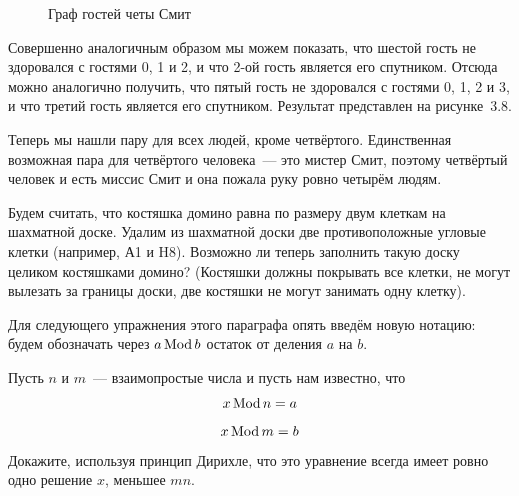 \begin{example}
\begin{figure}[h]
\caption{Граф гостей четы Смит}
\end{figure}

Совершенно аналогичным образом мы можем показать, что шестой гость не здоровался с гостями 0, 1 и 2, и что 2-ой гость является его спутником. Отсюда можно аналогично получить, что пятый гость не здоровался с гостями 0, 1, 2 и 3, и что третий гость является его спутником. Результат представлен на рисунке~3.8.

Теперь мы нашли пару для всех людей, кроме четвёртого. Единственная возможная пара для четвёртого человека~— это мистер Смит, поэтому четвёртый человек и есть миссис Смит и она пожала руку ровно четырём людям.
\end{example}

\begin{exercise}
Будем считать, что костяшка домино равна по размеру двум клеткам на шахматной доске. Удалим из шахматной доски две противоположные угловые клетки (например, А1 и H8). Возможно ли теперь заполнить такую доску целиком костяшками домино? (Костяшки должны покрывать все клетки, не могут вылезать за границы доски, две костяшки не могут занимать одну клетку).
\end{exercise}

Для следующего упражнения этого параграфа опять введём новую нотацию: будем обозначать через $a\operatorname{Mod} b$ остаток от деления $a$ на $b$.

\begin{exercise}
Пусть $n$ и $m$~— взаимопростые числа и пусть нам известно, что
$$x\operatorname{Mod} n = a$$
$$x\operatorname{Mod} m = b$$
Докажите, используя принцип Дирихле, что это уравнение всегда имеет ровно одно решение $x$, меньшее $mn$.
\end{exercise}

